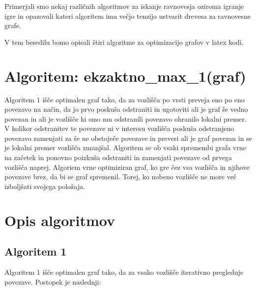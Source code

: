 \documentclass[fin1, tisk]{fmfdelo}
\begin{document}
Primerjali smo nekaj različnih algoritmov za iskanje ravnovesja oziroma igranje igre
in opazovali kateri algoritem ima večjo tenzijo ustvarit drevesa za ravnovesne grafe.


V tem besedilu bomo opisali štiri algoritme za optimizacijo grafov v latex kodi.

\section{Algoritem: ekzaktno\_max\_1(graf)}

Algoritem $1$ išče optimalen graf tako, da za vozlišča po vrsti preveja eno po eno
povezavo na način, da jo prvo poskuša odstraniti in ugotoviti ali je graf še vedno
povezan in ali je vozlišče ki smo mu odstranili povezavo ohranilo lokalni premer.
V kolikor odstranitev te povezave ni v interesu vozlišča poskuša odstranjeno povezavo
zamenjati za še ne obstoječe povezave in preveri ali je graf povezan in se je lokalni
premer vozlišča zmanjšal. Algoritem se ob vsaki spremembi grafa vrne na začetek in
ponovno poizkuša odstraniti in zamenjati povezave od prvega vozlišča naprej.
Algoriem vrne optimiziran graf, ko gre čez vsa vozlišča in njihove povezave brez,
da bi se graf spremenil. Torej, ko nobeno vozlišče ne more več izboljšati svojega položaja.


\section*{Opis algoritmov}

\subsection*{Algoritem 1}

Algoritem $1$ išče optimalen graf tako, da za vsako vozlišče iterativno pregleduje povezave. Postopek je naslednji:
\end{document}
